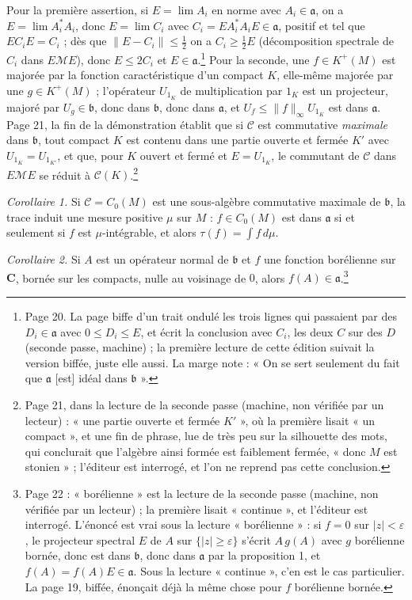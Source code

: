 \documentclass[11pt,a4paper]{article}
\begin{document}
Pour la première assertion, si $E = \lim A_i$ en norme avec $A_i \in
\mathfrak{a}$, on a $E = \lim A_i^{*}A_i$, donc $E = \lim C_i$ avec $C_i =
E A_i^{*} A_i E \in \mathfrak{a}$, positif et tel que $EC_iE = C_i$ ; dès
que $\|E - C_i\| \leq \frac12$ on a $C_i \geq \frac12 E$ (décomposition
spectrale de $C_i$ dans $E\mathcal{M}E$), donc $E \leq 2C_i$ et $E \in
\mathfrak{a}$.\footnote{Page 20. La page biffe d'un trait ondulé les trois
lignes qui passaient par des $D_i \in \mathfrak{a}$ avec $0 \leq D_i \leq E$,
et écrit la conclusion avec $C_i$, les deux $C$ sur des $D$ (seconde passe,
machine) ; la première lecture de cette édition suivait la version biffée,
juste elle aussi. La marge note : « On se sert seulement du fait que
$\mathfrak{a}$ [est] idéal dans $\mathfrak{b}$ ».}
Pour la seconde, une $f \in K^{+}(M)$ est majorée par la fonction
caractéristique d'un compact $K$, elle-même majorée par une $g \in K^{+}(M)$ ;
l'opérateur $U_{1_K}$ de multiplication par $1_K$ est un projecteur, majoré
par $U_g \in \mathfrak{b}$, donc dans $\mathfrak{b}$, donc dans
$\mathfrak{a}$, et $U_f \leq \|f\|_\infty U_{1_K}$ est dans $\mathfrak{a}$.
Page 21, la fin de la démonstration établit que si $\mathcal{C}$ est
commutative \emph{maximale} dans $\mathfrak{b}$, tout compact $K$ est contenu
dans une partie ouverte et fermée $K'$ avec $U_{1_K} = U_{1_{K'}}$, et que,
pour $K$ ouvert et fermé et $E = U_{1_K}$, le commutant de $\mathcal{C}$
dans $E\mathcal{M}E$ se réduit à $\mathcal{C}(K)$.\footnote{Page 21, dans la
lecture de la seconde passe (machine, non vérifiée par un lecteur) : « une
partie ouverte et fermée $K'$ », où la première lisait « un compact », et
une fin de phrase, lue de très peu sur la silhouette des mots, qui
conclurait que l'algèbre ainsi formée est faiblement fermée, « donc $M$ est
stonien » ; l'éditeur est interrogé, et l'on ne reprend pas cette
conclusion.}

\emph{Corollaire 1.} Si $\mathcal{C} = C_0(M)$ est une sous-algèbre
commutative maximale de $\mathfrak{b}$, la trace induit une mesure positive
$\mu$ sur $M$ : $f \in C_0(M)$ est dans $\mathfrak{a}$ si et seulement si $f$
est $\mu$-intégrable, et alors $\tau(f) = \int f\,d\mu$.

\emph{Corollaire 2.} Si $A$ est un opérateur normal de $\mathfrak{b}$ et $f$
une fonction borélienne sur $\mathbf{C}$, bornée sur les compacts, nulle au
voisinage de $0$, alors $f(A) \in \mathfrak{a}$.\footnote{Page 22 : « borélienne »
est la lecture de la seconde passe (machine, non vérifiée par un lecteur) ;
la première lisait « continue », et l'éditeur est interrogé. L'énoncé est vrai
sous la lecture « borélienne » : si $f = 0$ sur $|z| < \varepsilon$, le
projecteur spectral $E$ de $A$ sur $\{|z| \geq \varepsilon\}$ s'écrit $A\,g(A)$
avec $g$ borélienne bornée, donc est dans $\mathfrak{b}$, donc dans
$\mathfrak{a}$ par la proposition 1, et $f(A) = f(A)E \in \mathfrak{a}$. Sous
la lecture « continue », c'en est le cas particulier. La page 19, biffée,
énonçait déjà la même chose pour $f$ borélienne bornée.}
\end{document}
